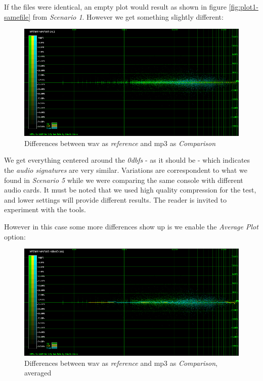 \documentclass[10pt,a4paper]{report}
\newcommand{\db}[1]{\textit{#1\acrshort{dbfs}}}
\begin{document}
If the files were identical, an empty plot would result as shown in figure \ref{fig:plot1-samefile} from \textit{Scenario 1}. However we get something slightly different:

\begin{figure}[H]
	\centering
	\includegraphics[width=1.0\linewidth]{images/interpretation/Plot6-mp3-1.png}
	\caption[WAV vs MP3]{Differences between \acrshort{wav} as \textit{reference} and \acrshort{mp3} as \textit{Comparison}}
	\label{fig:plot6-mp3-1}
\end{figure}

We get everything centered around the \db{0} - as it should be - which indicates the \textit{audio signatures} are very similar. Variations are correspondent to what we found in \textit{Scenario 5} while we were comparing the same console with different audio cards. It must be noted that we used high quality compression for the test, and lower settings will provide different results. The reader is invited to experiment with the tools.

However in this case some more differences show up is we enable the \textit{Average Plot} option:

\begin{figure}[H]
	\centering
	\includegraphics[width=1.0\linewidth]{images/interpretation/Plot6-mp3-2.png}
	\caption[WAV vs MP3 Averaged]{Differences between \acrshort{wav} as \textit{reference} and \acrshort{mp3} as \textit{Comparison}, averaged}
	\label{fig:plot6-mp3-2}
\end{figure}
\end{document}
